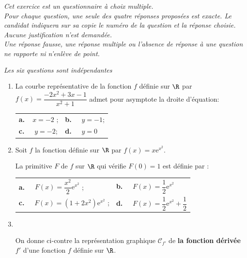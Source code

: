 \medskip

\emph{Cet exercice est un questionnaire à choix multiple.\\
Pour chaque question, une seule des quatre réponses proposées est exacte. Le candidat indiquera sur sa copie le numéro de la question et la réponse choisie. \\
Aucune justification n'est demandée.\\
Une réponse fausse, une réponse multiple ou l'absence de réponse à une question ne rapporte ni n'enlève de point.}

\emph{Les six questions sont indépendantes}

\medskip

\begin{enumerate}
\item La courbe représentative de la fonction $f$ définie sur $\R$ par $f(x) = \dfrac{-2x^2 + 3x - 1}{x^2 + 1}$ admet pour asymptote
la droite d'équation:

\begin{center}
\begin{tabularx}{\linewidth}{*{2}{X}}
\textbf{a.~~}$x = -2$ ; &\textbf{b.~~} $y = -1$;\\
\textbf{c.~~} $y = - 2$;&\textbf{d.~~} $y = 0$
\end{tabularx}
\end{center}
\item Soit $f$ la fonction définie sur $\R$ par $f(x) = x\text{e}^{x^2}$.

La primitive $F$ de $f$ sur $\R$ qui vérifie $F(0) = 1$ est définie par :

\begin{center}
\renewcommand\arraystretch{1.9}
\begin{tabularx}{\linewidth}{*{2}{X}}
\textbf{a.~~} $F(x) = \dfrac{x^2}{2}\text{e}^{x^2}$ ;&\textbf{b.~~} $F(x) = \dfrac{1}{2}\text{e}^{x^2}$\\
\textbf{c.~~} $F(x) = \left(1 + 2x^2\right)\text{e}^{x^2}$ ;&\textbf{d.~~} $F(x) = \dfrac{1}{2}\text{e}^{x^2} + \dfrac{1}{2}$
\end{tabularx}
\renewcommand\arraystretch{1}
\end{center}

\item ~

\begin{minipage}{0.4\linewidth}
On donne ci-contre la représentation graphique $\mathcal{C}_{f'}$ de \textbf{la fonction dérivée }\boldmath $f'$\unboldmath{}  d'une fonction $f$ définie sur $\R$.


\end{minipage}
\end{enumerate}
